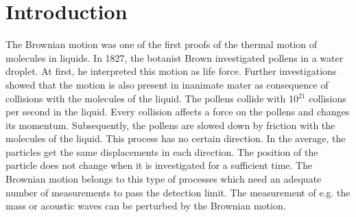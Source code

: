 \documentclass{tudphygp_eng}
\author{Dr. E. Lavrov, Thomas Fey}
\date{Stand: 10.03.2015}
\begin{document}
\maketitle



\section{Introduction}

The Brownian motion was one of the first proofs of the thermal motion of molecules in liquids. In 1827, the botanist Brown investigated pollens in a water droplet. At first, he interpreted this motion as life force. Further investigations showed that the motion is also present in inanimate mater as consequence of collisions with the molecules of the liquid. The pollens collide with 10$^{21}$ collisions per second in the liquid. Every collision affects a force on the pollens and changes its momentum. Subsequently, the pollens are slowed down by friction with the molecules of the liquid. This process has no certain direction. In the average, the particles get the same displacements in each direction. The position of the particle does not change when it is investigated for a sufficient time. The Brownian motion belongs to this type of processes which need an adequate number of measurements to pass the detection limit. The measurement of e.g. the mass or acoustic waves can be perturbed by the Brownian motion.
\end{document}
